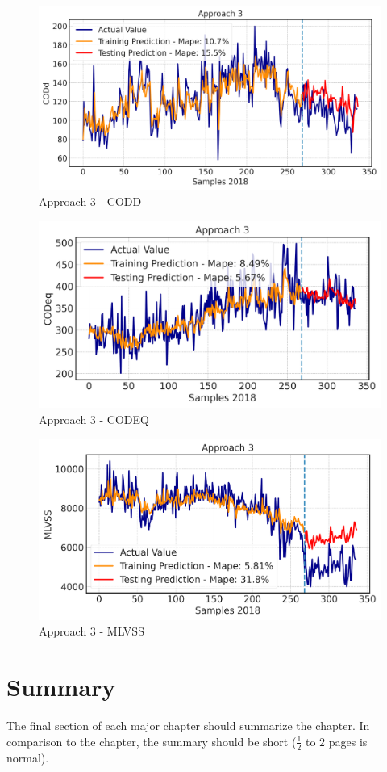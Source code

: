 \begin{figure}[h]
\centering
\includegraphics[width=\linewidth]{figures/Ch6/CODd-3.png}
\caption{Approach 3 - CODD}
\label{f:App3-codd}
\end{figure}

\begin{figure}[h]
\centering
\includegraphics[width=\linewidth]{figures/Ch6/CODeq-3.png}
\caption{Approach 3 - CODEQ}
\label{f:App3-codeq}
\end{figure}

\begin{figure}[h]
\centering
\includegraphics[width=\linewidth]{figures/Ch6/MVLSS-approach3.png}
\caption{Approach 3 - MLVSS}
\label{f:App3-MLVSS}
\end{figure}


\section{Summary}
\label{s:Contribution-1-Summary}

The final section of each major chapter should summarize the chapter. In comparison to the chapter, the summary should be short ($\frac{1}{2}$ to $2$ pages is normal).